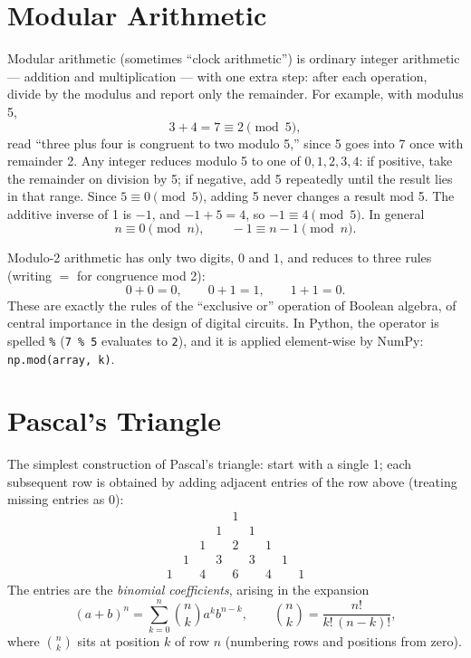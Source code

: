 \chapter{Modular Arithmetic}
\label{app:modular}

Modular arithmetic (sometimes ``clock arithmetic'') is ordinary
integer arithmetic --- addition and multiplication --- with one extra
step: after each operation, divide by the modulus and report only the
remainder.  For example, with modulus 5,
\[
  3 + 4 = 7 \equiv 2 \pmod 5,
\]
read ``three plus four is congruent to two modulo 5,'' since 5 goes
into 7 once with remainder 2.  Any integer reduces modulo 5 to one of
$0,1,2,3,4$: if positive, take the remainder on division by 5; if
negative, add 5 repeatedly until the result lies in that range.  Since
$5 \equiv 0 \pmod 5$, adding 5 never changes a result mod 5.  The
additive inverse of 1 is $-1$, and $-1+5 = 4$, so $-1 \equiv 4
\pmod5$.  In general
\[
  n \equiv 0 \pmod n, \qquad -1 \equiv n-1 \pmod n .
\]

Modulo-2 arithmetic has only two digits, $0$ and $1$, and reduces to
three rules (writing $=$ for congruence mod 2):
\[
  0 + 0 = 0, \qquad 0 + 1 = 1, \qquad 1 + 1 = 0 .
\]
These are exactly the rules of the ``exclusive or'' operation of
Boolean algebra, of central importance in the design of digital
circuits.  In Python, the operator is spelled \texttt{\%}
(\texttt{7 \% 5} evaluates to \texttt{2}), and it is applied
element-wise by NumPy: \texttt{np.mod(array, k)}.

\chapter{Pascal's Triangle}
\label{app:pascal}

The simplest construction of Pascal's triangle: start with a single 1;
each subsequent row is obtained by adding adjacent entries of the row
above (treating missing entries as 0):
\[
\begin{array}{ccccccccc}
 & & & & 1\\
 & & & 1 & & 1\\
 & & 1 & & 2 & & 1\\
 & 1 & & 3 & & 3 & & 1\\
1 & & 4 & & 6 & & 4 & & 1
\end{array}
\]
The entries are the \emph{binomial coefficients}, arising in the
expansion
\[
  (a+b)^n = \sum_{k=0}^{n} \binom{n}{k} a^k b^{n-k},
  \qquad \binom{n}{k} = \frac{n!}{k!\,(n-k)!},
\]
where $\binom{n}{k}$ sits at position $k$ of row $n$ (numbering rows
and positions from zero).

